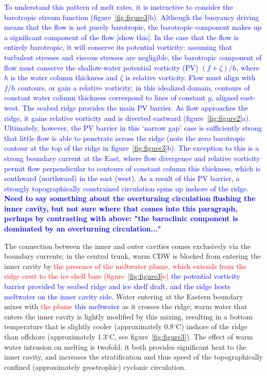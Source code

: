 \documentclass[draft]{agujournal2019}
\newcommand{\red}[1]{\textcolor{red}{#1}}
\newcommand{\blue}[1]{\textcolor{blue}{#1}}
\begin{document}
\textcolor{blue}{To understand this pattern of melt rates, it is instructive to consider the barotropic stream function (figure~\ref{fig:figure3}b). Although the buoyancy driving means that the flow is not purely barotropic, the barotropic component makes up a significant component of the flow [show this]. In the case that the flow is entirely barotropic, it will conserve its potential vorticity: assuming that turbulent stresses and viscous stresses are negligible, the barotropic component of flow must conserve the shallow-water potential vorticity (PV) $(f + \zeta)/h$, where $h$ is the water column thickness and $\zeta$ is relative vorticity. Flow must align with $f/h$ contours, or gain a relative vorticity; in this idealized domain, contours of constant water column thickness correspond to lines of constant $y$, aligned east-west. The seabed ridge provides the main PV barrier. As flow approaches the ridge, it gains relative vorticity and is diverted eastward  (figure~\ref{fig:figure2}a). Ultimately, however, the PV barrier in this `narrow gap' case is sufficiently strong that little flow is able to penetrate across the ridge (note the zero barotropic contour at the top of the ridge in figure~\ref{fig:figure3}b). The exception to this is a strong boundary current at the East, where flow divergence and relative vorticity permit flow perpendicular to contours of constant column this thickness, which is southward (northward) in the east (west). As a result of this PV barrier, a strongly topographically constrained circulation spins up inshore of the ridge. \textbf{Need to say something about the overturning circulation flushing the inner cavity, but not sure where that comes into this paragraph, perhaps by contrasting with above: "the baroclinic component is dominated by an overturning circulation..."}}

The connection between the inner and outer cavities comes exclusively via the boundary currents; in the central trunk, warm CDW is blocked from entering the inner cavity by \textcolor{red}{the presence of the meltwater plume, which extends from the ridge crest to the ice shelf base (figure~\ref{fig:figure3}e)} \textcolor{blue}{the potential vorticity barrier provided by seabed ridge and ice shelf draft, and the ridge hosts meltwater on the inner cavity side}. Water entering at the Eastern boundary mixes with \red{the plume} \blue{this meltwater} as it crosses the ridge; warm water that enters the inner cavity is lightly modified by this mixing, resulting in a bottom temperature that is slightly cooler (approximately 0.8${}^\circ$C) inshore of the ridge than offshore (approximately 1.3${}^\circ$C, see figure~\ref{fig:figure3}). The effect of warm water intrusion on melting is twofold: it both provides significant heat to the inner cavity, and increases the stratification and thus speed of the topographically confined (approximately geostrophic) cyclonic circulation.
\end{document}
